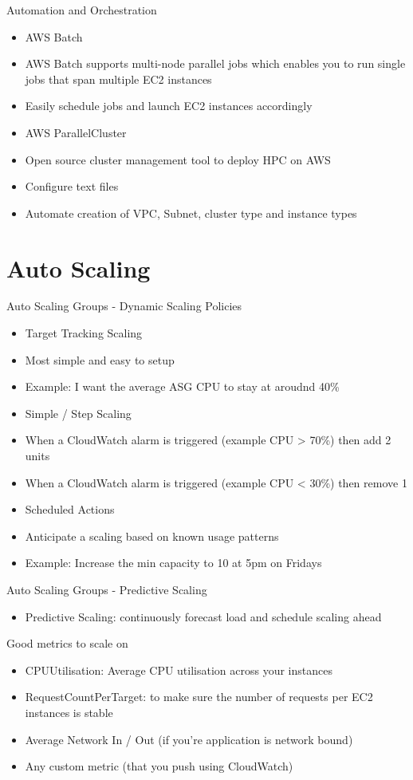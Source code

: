 Automation and Orchestration
\begin{itemize}
    \item AWS Batch
    \item AWS Batch supports multi-node parallel jobs which enables you to run single jobs that span multiple EC2 instances
    \item Easily schedule jobs and launch EC2 instances accordingly
    \item AWS ParallelCluster
    \item Open source cluster management tool to deploy HPC on AWS
    \item Configure text files
    \item Automate creation of VPC, Subnet, cluster type and instance types
\end{itemize}


\section{Auto Scaling}
Auto Scaling Groups - Dynamic Scaling Policies
\begin{itemize}
    \item Target Tracking Scaling
    \item Most simple and easy to setup
    \item Example: I want the average ASG CPU to stay at aroudnd 40\%
    \item Simple / Step Scaling
    \item When a CloudWatch alarm is triggered (example CPU  > 70\%) then add 2 units
    \item When a CloudWatch alarm is triggered (example CPU < 30\%) then remove 1
    \item Scheduled Actions
    \item Anticipate a scaling based on known usage patterns
    \item Example: Increase the min capacity to 10 at 5pm on Fridays
\end{itemize}

Auto Scaling Groups - Predictive Scaling
\begin{itemize}
    \item Predictive Scaling: continuously forecast load and schedule scaling ahead
\end{itemize}

Good metrics to scale on
\begin{itemize}
    \item CPUUtilisation: Average CPU utilisation across your instances
    \item RequestCountPerTarget: to make sure the number of requests per EC2 instances is stable
    \item Average Network In / Out (if you're application is network bound)
    \item Any custom metric (that you push using CloudWatch)
\end{itemize}

